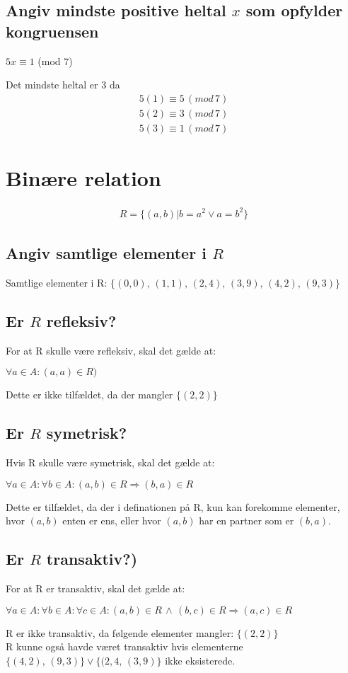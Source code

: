 \documentclass[a4paper,10pt]{article}
\newcommand{\R}{\mathbb{R}}
\begin{document}
\subsection*{Angiv mindste positive heltal $x$ som opfylder kongruensen}
\begin{center}
$5x \equiv 1$ (mod $7$)
\end{center}
Det mindste heltal er $3$ da
\begin{align*}
5(1) \equiv 5 \,(mod \,7)\\
5(2) \equiv 3 \,(mod \,7)\\
5(3) \equiv 1 \,(mod \,7)
\end{align*}
\section{Binære relation}
\begin{align*}
R = \{(a,b)|b=a^2 \vee a = b^2 \}
\end{align*}
\subsection*{Angiv samtlige elementer i $R$}
Samtlige elementer i R: $\{(0,0),\,(1,1),\,(2,4),\,(3,9),\,(4,2),\, (9,3)\}$\\
\subsection*{Er $R$ refleksiv?}
For at R skulle være refleksiv, skal det gælde at: \begin{center}
$\forall a\in A : (a,a) \in R)$\\
\end{center} 
Dette er ikke tilfældet, da der mangler $\{(2,2)\}$\\
\subsection*{Er $R$ symetrisk?}
Hvis R skulle være symetrisk, skal det gælde at:
\begin{center}
$\forall a\in A : \forall b\in A : (a, b) \in R \Rightarrow (b, a) \in R$\\ 
\end{center}
Dette er tilfældet, da der i definationen på R, kun kan forekomme elementer, hvor $(a,b)$ enten er ens, eller hvor $(a,b)$ har en partner som er $(b,a)$.
\subsection*{Er $R$ transaktiv?)}
For at R er transaktiv, skal det gælde at:
\begin{center}
$\forall a\in A : \forall b \in A : \forall c \in A :  (a,b) \in R\, \wedge \, (b,c) \in R \Rightarrow (a,c) \in R
$
\end{center}
R er ikke transaktiv, da følgende elementer mangler: $\{(2,2)\}$\\R kunne også havde været transaktiv hvis elementerne $\{(4,2),\,(9,3)\} \vee \{(2,4,\,(3,9)\}$ ikke eksisterede.
\end{document}
